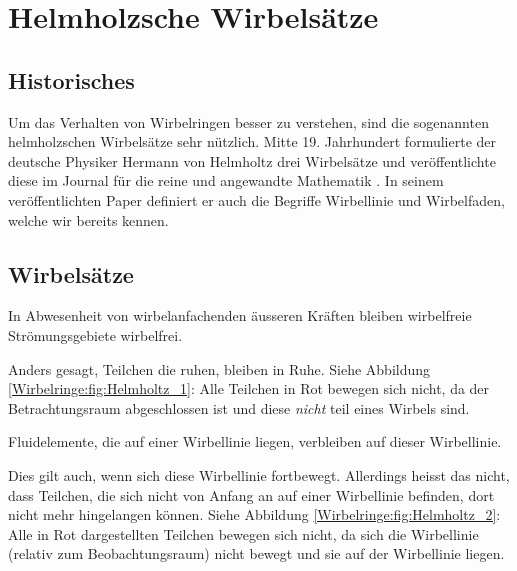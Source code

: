 %
%
%
\section{Helmholzsche Wirbelsätze}

\subsection{Historisches}

Um das Verhalten von Wirbelringen besser zu verstehen, sind die sogenannten helmholzschen Wirbelsätze sehr nützlich. 
Mitte 19. Jahrhundert formulierte der deutsche Physiker Hermann von Helmholtz drei Wirbelsätze und veröffentlichte diese im Journal für die reine und angewandte Mathematik \cite{Wirbelringe:JournalHelmholz}.
In seinem veröffentlichten Paper definiert er auch die Begriffe Wirbellinie und Wirbelfaden, welche wir bereits kennen.

\subsection{Wirbelsätze}



\begin{satz}
    \label{Wirbelringe:satz:wirbelsatz1}
    In Abwesenheit von wirbelanfachenden äusseren Kräften bleiben wirbelfreie Strömungsgebiete wirbelfrei.
\end{satz}

Anders gesagt, Teilchen die ruhen, bleiben in Ruhe. 
Siehe Abbildung \ref{Wirbelringe:fig:Helmholtz_1}: 
Alle Teilchen in Rot bewegen sich nicht, da der Betrachtungsraum abgeschlossen ist und diese {\em nicht} teil eines Wirbels sind.

\begin{satz}
    \label{Wirbelringe:satz:wirbelsatz2}
    Fluidelemente, die auf einer Wirbellinie liegen, verbleiben auf dieser Wirbellinie.
\end{satz}

Dies gilt auch, wenn sich diese Wirbellinie fortbewegt.
Allerdings heisst das nicht, dass Teilchen, die sich nicht von Anfang an auf einer Wirbellinie befinden, dort nicht mehr hingelangen können.
Siehe Abbildung \ref{Wirbelringe:fig:Helmholtz_2}:
Alle in Rot dargestellten Teilchen bewegen sich nicht, da sich die Wirbellinie (relativ zum Beobachtungsraum) nicht bewegt und sie auf der Wirbellinie liegen.

